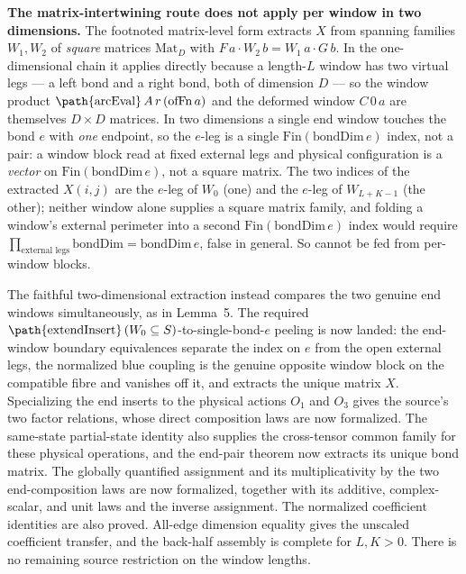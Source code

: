 \documentclass{article}
\begin{document}
\medskip
\noindent\textbf{The matrix-intertwining route does not apply per window in
    two dimensions.} The footnoted matrix-level form
 extracts $X$
from spanning families $W_1, W_2$ of \emph{square} matrices
$\mathrm{Mat}_{D}$ with $F\,a \cdot W_2\,b = W_1\,a \cdot G\,b$. In the
one-dimensional chain it applies directly because a length-$L$ window has two
virtual legs --- a left bond and a right bond, both of dimension $D$ --- so the
window product $\text{\path{arcEval}}\,A\,r\,(\mathrm{ofFn}\,a)$ and the deformed
window $C\,0\,a$ are themselves $D \times D$ matrices. In two dimensions a
single end window touches the bond $e$ with \emph{one} endpoint, so the
$e$-leg is a single $\mathrm{Fin}(\mathrm{bondDim}\,e)$ index, not a pair: a
window block read at fixed external legs and physical configuration is a
\emph{vector} on $\mathrm{Fin}(\mathrm{bondDim}\,e)$, not a square matrix. The
two indices of the extracted $X(i,j)$ are the $e$-leg of $W_0$ (one) and the
$e$-leg of $W_{L+K-1}$ (the other); neither window alone supplies a square
matrix family, and folding a window's external perimeter into a second
$\mathrm{Fin}(\mathrm{bondDim}\,e)$ index would require
$\prod_{\text{external legs}} \mathrm{bondDim} = \mathrm{bondDim}\,e$, false in
general. So  cannot be fed from
per-window blocks.

The faithful two-dimensional extraction instead compares the two genuine end
windows simultaneously, as in Lemma~5.  The required
$\text{\path{extendInsert}}\,(W_0 \subseteq S)$-to-single-bond-$e$ peeling is now
landed: the end-window boundary equivalences separate the index on $e$ from
the open external legs, the normalized blue coupling is the genuine opposite
window block on the compatible fibre and vanishes off it, and
 extracts
the unique matrix $X$.  Specializing the end inserts to the physical actions
$O_1$ and $O_3$ gives the source's two factor relations, whose direct
composition laws are now formalized.  The same-state partial-state identity
also supplies the cross-tensor common family for these physical operations,
and the end-pair theorem now extracts its unique bond matrix.  The globally
quantified assignment and its multiplicativity by the two end-composition laws
are now formalized, together with its additive, complex-scalar, and unit
laws and the inverse assignment. The normalized coefficient identities are
also proved. All-edge dimension equality gives the unscaled coefficient
transfer, and the back-half assembly is complete for $L,K>0$.
There is no remaining source restriction on the window lengths.
\end{document}
